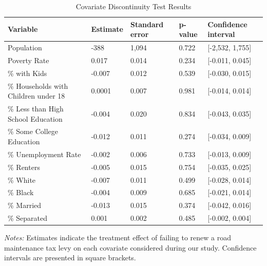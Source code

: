 \begin{table}[!h]
    \centering
    \caption{Covariate Discontinuity Test Results}
    \label{tab:covariate_discontinuity}
    \begin{tabularx}{\textwidth}{l*{3}{X}X}
        \hline
        Variable & Estimate & Standard error & p-value & Confidence interval \\
        \hline
        Population                           & -388      & 1,094   & 0.722  & [-2,532, 1,755] \\
        Poverty Rate                         & 0.017     & 0.014   & 0.234  & [-0.011, 0.045] \\
        \% with Kids                         & -0.007    & 0.012   & 0.539  & [-0.030, 0.015] \\
        \% Households with Children under 18 & 0.0001    & 0.007   & 0.981  & [-0.014, 0.014] \\
        \% Less than High School Education   & -0.004    & 0.020   & 0.834  & [-0.043, 0.035] \\
        \% Some College Education            & -0.012    & 0.011   & 0.274  & [-0.034, 0.009] \\
        \% Unemployment Rate                 & -0.002    & 0.006   & 0.733  & [-0.013, 0.009] \\
        \% Renters                           & -0.005    & 0.015   & 0.754  & [-0.035, 0.025] \\
        \% White                             & -0.007    & 0.011   & 0.499  & [-0.028, 0.014] \\
        \% Black                             & -0.004    & 0.009   & 0.685  & [-0.021, 0.014] \\
        \% Married                           & -0.013    & 0.015   & 0.374  & [-0.042, 0.016] \\
        \% Separated                         & 0.001     & 0.002   & 0.485  & [-0.002, 0.004] \\
        \hline
    \end{tabularx}
    \begin{tablenotes}
        \small
        \item \textit{Notes:} Estimates indicate the treatment effect of failing to renew a road maintenance tax levy on each covariate considered during our study. Confidence intervals are presented in square brackets.
    \end{tablenotes}
\end{table}

